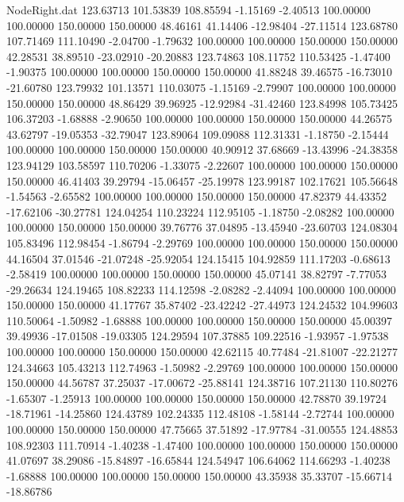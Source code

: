\begin{filecontents}{NodeRight.dat}
 123.63713  101.53839  108.85594    -1.15169   -2.40513  100.00000  100.00000  150.00000  150.00000   48.46161   41.14406  -12.98404  -27.11514
 123.68780  107.71469  111.10490    -2.04700   -1.79632  100.00000  100.00000  150.00000  150.00000   42.28531   38.89510  -23.02910  -20.20883
 123.74863  108.11752  110.53425    -1.47400   -1.90375  100.00000  100.00000  150.00000  150.00000   41.88248   39.46575  -16.73010  -21.60780
 123.79932  101.13571  110.03075    -1.15169   -2.79907  100.00000  100.00000  150.00000  150.00000   48.86429   39.96925  -12.92984  -31.42460
 123.84998  105.73425  106.37203    -1.68888   -2.90650  100.00000  100.00000  150.00000  150.00000   44.26575   43.62797  -19.05353  -32.79047
 123.89064  109.09088  112.31331    -1.18750   -2.15444  100.00000  100.00000  150.00000  150.00000   40.90912   37.68669  -13.43996  -24.38358
 123.94129  103.58597  110.70206    -1.33075   -2.22607  100.00000  100.00000  150.00000  150.00000   46.41403   39.29794  -15.06457  -25.19978
 123.99187  102.17621  105.56648    -1.54563   -2.65582  100.00000  100.00000  150.00000  150.00000   47.82379   44.43352  -17.62106  -30.27781
 124.04254  110.23224  112.95105    -1.18750   -2.08282  100.00000  100.00000  150.00000  150.00000   39.76776   37.04895  -13.45940  -23.60703
 124.08304  105.83496  112.98454    -1.86794   -2.29769  100.00000  100.00000  150.00000  150.00000   44.16504   37.01546  -21.07248  -25.92054
 124.15415  104.92859  111.17203    -0.68613   -2.58419  100.00000  100.00000  150.00000  150.00000   45.07141   38.82797   -7.77053  -29.26634
 124.19465  108.82233  114.12598    -2.08282   -2.44094  100.00000  100.00000  150.00000  150.00000   41.17767   35.87402  -23.42242  -27.44973
 124.24532  104.99603  110.50064    -1.50982   -1.68888  100.00000  100.00000  150.00000  150.00000   45.00397   39.49936  -17.01508  -19.03305
 124.29594  107.37885  109.22516    -1.93957   -1.97538  100.00000  100.00000  150.00000  150.00000   42.62115   40.77484  -21.81007  -22.21277
 124.34663  105.43213  112.74963    -1.50982   -2.29769  100.00000  100.00000  150.00000  150.00000   44.56787   37.25037  -17.00672  -25.88141
 124.38716  107.21130  110.80276    -1.65307   -1.25913  100.00000  100.00000  150.00000  150.00000   42.78870   39.19724  -18.71961  -14.25860
 124.43789  102.24335  112.48108    -1.58144   -2.72744  100.00000  100.00000  150.00000  150.00000   47.75665   37.51892  -17.97784  -31.00555
 124.48853  108.92303  111.70914    -1.40238   -1.47400  100.00000  100.00000  150.00000  150.00000   41.07697   38.29086  -15.84897  -16.65844
 124.54947  106.64062  114.66293    -1.40238   -1.68888  100.00000  100.00000  150.00000  150.00000   43.35938   35.33707  -15.66714  -18.86786

\end{filecontents}
